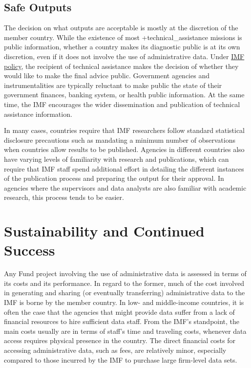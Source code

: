 \documentclass[
]{book}
\begin{document}
\hypertarget{safe-outputs-8}{%
\subsection{Safe Outputs}\label{safe-outputs-8}}

The decision on what outputs are acceptable is mostly at the discretion of the member country. While the existence of most +technical\_assistance\textbar{} missions is public information, whether a country makes its diagnostic public is at its own discretion, even if it does not involve the use of administrative data. Under \href{https://www.imf.org/external/np/pp/eng/2013/061013.pdf}{IMF policy}, the recipient of technical assistance makes the decision of whether they would like to make the final advice public. Government agencies and instrumentalities are typically reluctant to make public the state of their government finances, banking system, or health public information. At the same time, the IMF encourages the wider dissemination and publication of technical assistance information.

In many cases, countries require that IMF researchers follow standard statistical disclosure precautions such as mandating a minimum number of observations when countries allow results to be published. Agencies in different countries also have varying levels of familiarity with research and publications, which can require that IMF staff spend additional effort in detailing the different instances of the publication process and preparing the output for their approval. In agencies where the supervisors and data analysts are also familiar with academic research, this process tends to be easier.

\hypertarget{sustainability-and-continued-success-8}{%
\section{Sustainability and Continued Success}\label{sustainability-and-continued-success-8}}

Any Fund project involving the use of administrative data is assessed in terms of its costs and its performance. In regard to the former, much of the cost involved in generating and sharing (or eventually transferring) administrative data to the IMF is borne by the member country. In low- and middle-income countries, it is often the case that the agencies that might provide data suffer from a lack of financial resources to hire sufficient data staff. From the IMF's standpoint, the main costs usually are in terms of staff's time and traveling costs, whenever data access requires physical presence in the country. The direct financial costs for accessing administrative data, such as fees, are relatively minor, especially compared to those incurred by the IMF to purchase large firm-level data sets.
\end{document}
